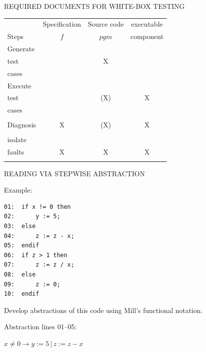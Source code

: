 \newpage
\centerline{REQUIRED DOCUMENTS FOR WHITE-BOX TESTING}
\bigskip

\begin{center}
\begin{tabular}{|l||c|c|c|}
\hline
                 & Specification & Source code & executable\\
Steps            &     $f$       & $pgm$       & component\\
\hline
\hline
Generate         &               &             &       \\
test             &               &     X       &       \\
cases            &               &             &       \\
\hline
Execute          &               &             &       \\
test             &               &     (X)     &     X \\
cases            &               &             &       \\
\hline
                 &               &             &       \\
Diagnosis        &      X        &     (X)     &     X \\
                 &               &             &       \\
\hline
isolate          &               &             &       \\
faults           &      X        &      X      &    X  \\
                 &               &             &       \\
\hline
\end{tabular}
\end{center}


\newpage
\centerline{READING VIA STEPWISE ABSTRACTION} %
\bigskip


Example: 

\begin{verbatim}
01:  if x != 0 then
02:      y := 5;
03:  else
04:      z := z - x;
05:  endif
06:  if z > 1 then
07:      z := z / x;
08:  else
09:      z := 0;
10:  endif
\end{verbatim}

Develop abstractions of this code using Mill's functional notation.

\bigskip

Abstraction lines 01--05:  

\(x \ne 0 \rightarrow y := 5 \,|\, z := z - x\)

